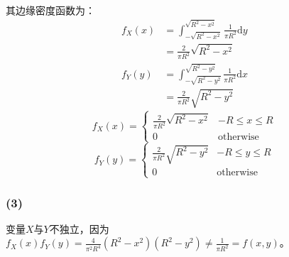 \documentclass[a4paper,12pt]{ctexart}
\begin{document}
其边缘密度函数为：
\begin{align*}
	f_X(x) &= \int_{-\sqrt{R^2-x^2}}^{\sqrt{R^2-x^2}} \frac{1}{\pi R^2} \mathrm{d}y \\
	&= \frac{2}{\pi R^2} \sqrt{R^2-x^2} \\
	f_Y(y) &= \int_{-\sqrt{R^2-y^2}}^{\sqrt{R^2-y^2}} \frac{1}{\pi R^2} \mathrm{d}x \\
	&= \frac{2}{\pi R^2} \sqrt{R^2-y^2}
\end{align*}
\begin{equation*}
	f_X(x) =
	\begin{cases}
		\frac{2}{\pi R^2} \sqrt{R^2-x^2} & -R \leq x \leq R \\
		0 & \text{otherwise}
	\end{cases}
\end{equation*}
\begin{equation*}
	f_Y(y) =
	\begin{cases}
		\frac{2}{\pi R^2} \sqrt{R^2-y^2} & -R \leq y \leq R \\
		0 & \text{otherwise}
	\end{cases}
\end{equation*}

\subsubsection*{(3)}

变量$X$与$Y$不独立，因为$f_X(x)f_Y(y) = \frac{4}{\pi^2 R^4} (R^2-x^2)(R^2-y^2) \neq \frac{1}{\pi R^2} = f(x,y)$。
\end{document}
